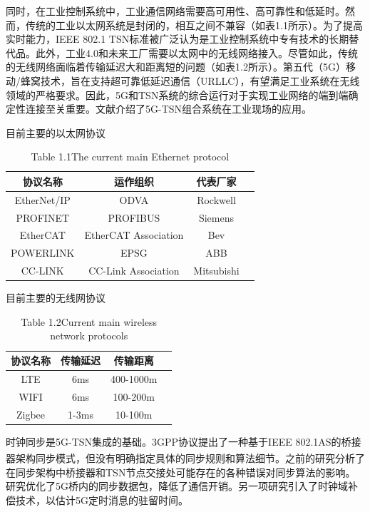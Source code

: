 \documentclass[UTF8,a4paper,12pt]{ctexart}
\numberwithin{equation}{section}
\begin{document}
	同时，在工业控制系统中，工业通信网络需要高可用性、高可靠性和低延时。然而，传统的工业以太网系统是封闭的，相互之间不兼容（如表1.1所示）。为了提高实时能力，IEEE 802.1 TSN标准被广泛认为是工业控制系统中专有技术的长期替代品。此外，工业4.0和未来工厂需要以太网中的无线网络接入。尽管如此，传统的无线网络面临着传输延迟大和距离短的问题（如表1.2所示）。第五代（5G）移动/蜂窝技术，旨在支持超可靠低延迟通信（URLLC），有望满足工业系统在无线领域的严格要求。因此，5G和TSN系统的综合运行对于实现工业网络的端到端确定性连接至关重要。文献\cite{zhang2022wireless}介绍了5G-TSN组合系统在工业现场的应用。
	\begin{table}[!htbp]
		\centering
		\caption{目前主要的以太网协议}
		\vspace{-10pt}
		\caption*{Table 1.1\quad The current main Ethernet protocol}
		
		\begin{tabular}{|c| c|c|c|}
			\hline
			\textbf{协议名称}& \textbf{运作组织}& \textbf{代表厂家} \\
			\hline
			EtherNet/IP
			& ODVA
			& Rockwell \\
			\hline
			PROFINET
			& PROFIBUS
			& Siemens \\
			\hline
			EtherCAT
			& EtherCAT Association
			& Bev \\
			\hline
			POWERLINK
			& EPSG
			& ABB \\
			\hline
			CC-LINK
			& CC-Link Association
			& Mitsubishi \\
			\hline
		\end{tabular}
	\end{table}
	\begin{table}[!htbp]
		\centering
		\caption{目前主要的无线网协议}
		\vspace{-10pt}
		\caption*{Table 1.2\quad Current main wireless network protocols}
		\begin{tabular}{|c| c|c|c|}
			\hline
			\textbf{协议名称}& \textbf{传输延迟}& \textbf{传输距离} \\
			\hline
			LTE
			& 6ms
			& 400-1000m \\
			\hline
			WIFI
			& 6ms
			& 100-200m \\
			\hline
			Zigbee
			& 1-3ms
			& 10-100m \\
			\hline
		\end{tabular}
	\end{table}
	时钟同步是5G-TSN集成的基础。3GPP协议提出了一种基于IEEE 802.1AS的桥接器架构同步模式，但没有明确指定具体的同步规则和算法细节\textsuperscript{\cite{888888}}。之前的研究\cite{9527833}分析了在同步架构中桥接器和TSN节点交接处可能存在的各种错误对同步算法的影响。研究\cite{9211936}优化了5G桥内的同步数据包，降低了通信开销。另一项研究\cite{9674640}引入了时钟域补偿技术，以估计5G定时消息的驻留时间。
	
\end{document}
